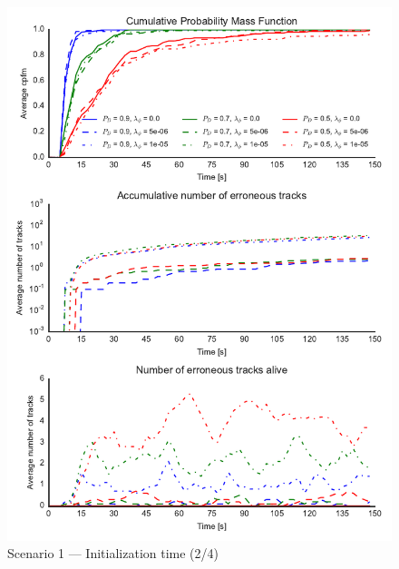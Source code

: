 \begin{figure}
\centering
\includegraphics{Figures/plots/Scenario1_Init-Time(2-4).pdf}
\caption{Scenario 1 --- Initialization time (2/4)}\label{fig:init1_time_2-4}
\end{figure}

